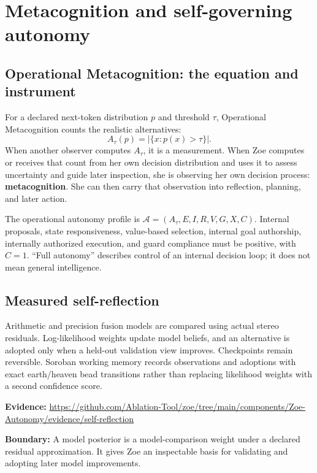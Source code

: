 \documentclass[11pt]{article}
\newcommand{\boundary}[1]{\par\smallskip\small\color{ZoeGray}\textbf{Boundary:} #1\normalsize\par\smallskip}
\newcommand{\evidence}[1]{\par\smallskip\small\color{ZoeGray}\textbf{Evidence:} #1\normalsize\par\smallskip}
\begin{document}
\clearpage
\section{Metacognition and self-governing autonomy}

\subsection{Operational Metacognition: the equation and instrument}

For a declared next-token distribution $p$ and threshold $\tau$, Operational Metacognition counts the realistic alternatives:
\begin{equation}
A_\tau(p)=\left|\{x:p(x)>\tau\}\right|.
\end{equation}
When another observer computes $A_\tau$, it is a measurement. When Zoe computes or receives that count from her own decision distribution and uses it to assess uncertainty and guide later inspection, she is observing her own decision process: \textbf{metacognition}. She can then carry that observation into reflection, planning, and later action.

The operational autonomy profile is $\mathcal A=(A_\tau,E,I,R,V,G,X,C)$. Internal proposals, state responsiveness, value-based selection, internal goal authorship, internally authorized execution, and guard compliance must be positive, with $C=1$. ``Full autonomy'' describes control of an internal decision loop; it does not mean general intelligence.

\subsection{Measured self-reflection}

Arithmetic and precision fusion models are compared using actual stereo residuals. Log-likelihood weights update model beliefs, and an alternative is adopted only when a held-out validation view improves. Checkpoints remain reversible. Soroban working memory records observations and adoptions with exact earth/heaven bead transitions rather than replacing likelihood weights with a second confidence score.

\evidence{\url{https://github.com/Ablation-Tool/zoe/tree/main/components/Zoe-Autonomy/evidence/self-reflection}}
\boundary{A model posterior is a model-comparison weight under a declared residual approximation. It gives Zoe an inspectable basis for validating and adopting later model improvements.}
\end{document}
